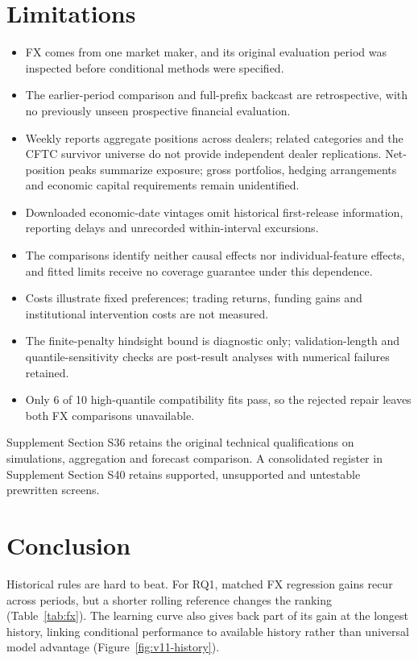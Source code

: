 \section{Limitations}\label{sec:limitations}

\begin{itemize}\setlength{\itemsep}{0pt}\setlength{\parskip}{0pt}
\item FX comes from one market maker, and its original evaluation period was inspected before conditional methods were specified.
\item The earlier-period comparison and full-prefix backcast are retrospective, with no previously unseen prospective financial evaluation.
\item Weekly reports aggregate positions across dealers; related categories and the CFTC survivor universe do not provide independent dealer replications. Net-position peaks summarize exposure; gross portfolios, hedging arrangements and economic capital requirements remain unidentified.
\item Downloaded economic-date vintages omit historical first-release information, reporting delays and unrecorded within-interval excursions.
\item The comparisons identify neither causal effects nor individual-feature effects, and fitted limits receive no coverage guarantee under this dependence.
\item Costs illustrate fixed preferences; trading returns, funding gains and institutional intervention costs are not measured.
\item The finite-penalty hindsight bound is diagnostic only; validation-length and quantile-sensitivity checks are post-result analyses with numerical failures retained.
\item Only 6 of 10 high-quantile compatibility fits pass, so the rejected repair leaves both FX comparisons unavailable.
\end{itemize}
Supplement Section S36 retains the original technical qualifications on simulations, aggregation and forecast comparison. A consolidated register in Supplement Section S40 retains supported, unsupported and untestable prewritten screens.

\FloatBarrier

\section{Conclusion}\label{sec:conclusion}

Historical rules are hard to beat. For RQ1, matched FX regression gains recur across periods, but a shorter rolling reference changes the ranking (Table~\ref{tab:fx}). The learning curve also gives back part of its gain at the longest history, linking conditional performance to available history rather than universal model advantage (Figure~\ref{fig:v11-history}).

